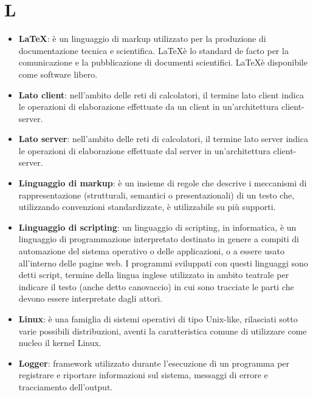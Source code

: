 \section{L}
\begin{itemize} 
	\item
	\textbf{\LaTeX}: è un linguaggio di markup utilizzato per la produzione di documentazione tecnica e scientifica. \LaTeX è lo standard de facto per la comunicazione e la pubblicazione di documenti scientifici. \LaTeX è disponibile come software libero.
	\item
	\textbf{Lato client}: nell'ambito delle reti di calcolatori, il termine lato client indica le operazioni di elaborazione effettuate da un client in un'architettura client-server.
	\item
	\textbf{Lato server}: nell'ambito delle reti di calcolatori, il termine lato server indica le operazioni di elaborazione effettuate dal server in un'architettura client-server.
	\item
	\textbf{Linguaggio di markup}: è un insieme di regole che descrive i meccanismi di rappresentazione (strutturali, semantici o presentazionali) di un testo che, utilizzando convenzioni standardizzate, è utilizzabile su più supporti.
	\item
	\textbf{Linguaggio di scripting}: un linguaggio di scripting, in informatica, è un linguaggio di programmazione interpretato destinato in genere a compiti di automazione del sistema operativo o delle applicazioni, o a essere usato all'interno delle pagine web.
	I programmi sviluppati con questi linguaggi sono detti script, termine della lingua inglese utilizzato in ambito teatrale per indicare il testo (anche detto canovaccio) in cui sono tracciate le parti che devono essere interpretate dagli attori.
	\item
	\textbf{Linux}: è una famiglia di sistemi operativi di tipo Unix-like, rilasciati sotto varie possibili distribuzioni, aventi la caratteristica comune di utilizzare come nucleo il kernel Linux.
	\item
	\textbf{Logger}: framework utilizzato durante l'esecuzione di un programma per registrare e riportare informazioni sul sistema, messaggi di errore e tracciamento dell'output.
\end{itemize}